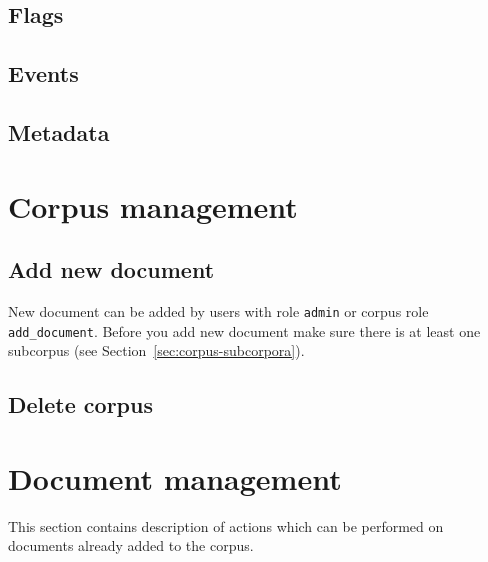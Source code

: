 \documentclass[a4paper,10pt,oneside]{scrbook}
\begin{document}
\section{Flags}

\section{Events}

\section{Metadata}


\chapter{Corpus management}
\section{Add new document}

New document can be added by users with role \verb|admin| or corpus role \verb|add_document|. Before you add new document make sure there is at least one subcorpus (see Section~\ref{sec:corpus-subcorpora}).

\section{Delete corpus}


\chapter{Document management}
This section contains description of actions which can be performed on documents already added to the corpus.
\end{document}
